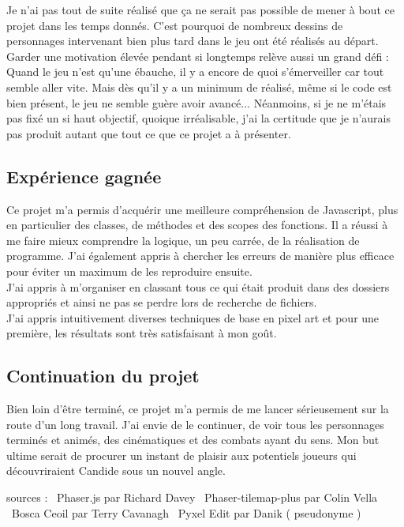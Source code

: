 \documentclass[11pt]{article}
\begin{document}
Je n'ai pas tout de suite réalisé que ça ne serait pas possible de mener à bout ce projet dans les temps donnés. C'est pourquoi de nombreux dessins de personnages intervenant bien plus tard dans le jeu ont été réalisés au départ. Garder une motivation élevée pendant si longtemps relève aussi un grand défi : Quand le jeu n'est qu'une ébauche, il y a encore de quoi s'émerveiller car tout semble aller vite. Mais dès qu'il y a un minimum de réalisé, même si le code est bien présent, le jeu ne semble guère avoir avancé... Néanmoins, si je ne m'étais pas fixé un si haut objectif, quoique irréalisable, j'ai la certitude que je n'aurais pas produit autant que tout ce que ce projet a à présenter.
\subsection{Expérience gagnée}
Ce projet m'a permis d'acquérir une meilleure compréhension de Javascript, plus en particulier des classes, de méthodes et des scopes des fonctions. Il a réussi à me faire mieux comprendre la logique, un peu carrée, de la réalisation de programme. J'ai également appris à chercher les erreurs de manière plus efficace pour éviter un maximum de les reproduire ensuite. \\ J'ai appris à m'organiser en classant tous ce qui était produit dans des dossiers appropriés et ainsi ne pas se perdre lors de recherche de fichiers.\\ J'ai appris intuitivement diverses techniques de base en pixel art et pour une première, les résultats sont très satisfaisant à mon goût. 
\subsection{Continuation du projet}
Bien loin d'être terminé, ce projet m'a permis de me lancer sérieusement sur la route d'un long travail. J'ai envie de le continuer, de voir tous les personnages terminés et animés, des cinématiques et des combats ayant du sens. Mon but ultime serait de procurer un instant de plaisir aux potentiels joueurs qui découvriraient Candide sous un nouvel angle. 

\newpage
{}
\begin{thebibliography}{9}
sources : \
Phaser.js par Richard Davey \
Phaser-tilemap-plus par Colin Vella \
Bosca Ceoil par Terry Cavanagh \
Pyxel Edit par Danik ( pseudonyme )\
\end{thebibliography}
\end{document}
